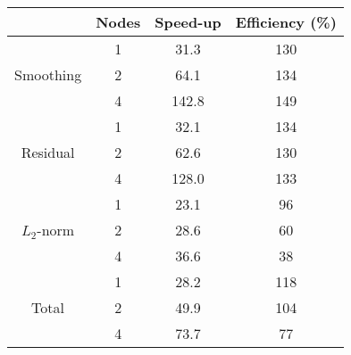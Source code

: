 \begin{tabular}{cccc}
    \toprule
                                & Nodes & Speed-up & Efficiency (\%) \\
    \midrule
    \multirow{3}{*}{Smoothing}  & 1     & 31.3     & 130             \\
                                & 2     & 64.1     & 134             \\
                                & 4     & 142.8    & 149             \\
    \midrule
    \multirow{3}{*}{Residual}   & 1     & 32.1     & 134             \\
                                & 2     & 62.6     & 130             \\
                                & 4     & 128.0    & 133             \\
    \midrule
    \multirow{3}{*}{$L_2$-norm} & 1     & 23.1     & 96              \\
                                & 2     & 28.6     & 60              \\
                                & 4     & 36.6     & 38              \\
    \midrule
    \multirow{3}{*}{Total}      & 1     & 28.2     & 118             \\
                                & 2     & 49.9     & 104             \\
                                & 4     & 73.7     & 77              \\
    \bottomrule
\end{tabular}
